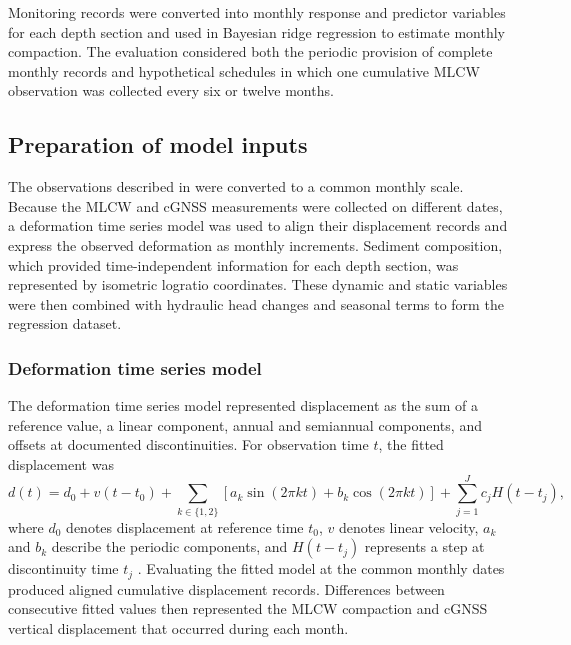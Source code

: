 Monitoring records were converted into monthly response and predictor variables for each depth section and used in Bayesian ridge regression to estimate monthly compaction. The evaluation considered both the periodic provision of complete monthly records and hypothetical schedules in which one cumulative MLCW observation was collected every six or twelve months.

\subsection{Preparation of model inputs}
\label{subsec:predictor_preparation}

The observations described in  were converted to a common monthly scale. Because the MLCW and cGNSS measurements were collected on different dates, a deformation time series model was used to align their displacement records and express the observed deformation as monthly increments. Sediment composition, which provided time-independent information for each depth section, was represented by isometric logratio coordinates. These dynamic and static variables were then combined with hydraulic head changes and seasonal terms to form the regression dataset.

\subsubsection{Deformation time series model}
\label{subsec:deformation_model}

The deformation time series model represented displacement as the sum of a reference value, a linear component, annual and semiannual components, and offsets at documented discontinuities. For observation time $t$, the fitted displacement was
\begin{equation}
d(t)=d_0+v(t-t_0)
+\sum_{k\in\{1,2\}}
\left[a_k\sin(2\pi k t)+b_k\cos(2\pi k t)\right]
+\sum_{j=1}^{J}c_j H(t-t_j),
\label{eq:deformation_model}
\end{equation}
where $d_0$ denotes displacement at reference time $t_0$, $v$ denotes linear velocity, $a_k$ and $b_k$ describe the periodic components, and $H(t-t_j)$ represents a step at discontinuity time $t_j$ \citep{nikolaidis_observation_2002}. Evaluating the fitted model at the common monthly dates produced aligned cumulative displacement records. Differences between consecutive fitted values then represented the MLCW compaction and cGNSS vertical displacement that occurred during each month.

